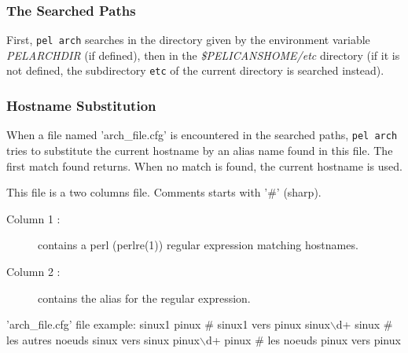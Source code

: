 \documentclass{article}
\begin{document}
\subsubsection*{The Searched Paths\label{arch_The_Searched_Paths}}


First, \texttt{pel arch} searches in the directory given by the environment
variable \emph{PELARCHDIR} (if defined), then in the \emph{\$PELICANSHOME/etc}
directory (if it is not defined, the subdirectory
\texttt{etc} of the current directory is searched instead).

\subsubsection*{Hostname Substitution\label{arch_Hostname_Substitution}}


When a file named 'arch\_file.cfg' is encountered in the searched paths,
\texttt{pel arch} tries to substitute the current hostname by an alias name found
in this file. The first match found returns. When no match is found, the
current hostname is used.



This file is a two columns file. Comments starts with '\#' (sharp).

\begin{description}

\item[Column 1 :] \mbox{}

contains a perl (perlre(1)) regular expression matching hostnames.


\item[Column 2 :] \mbox{}

contains the alias for the regular expression.

\end{description}


'arch\_file.cfg' file example:
 sinux1 pinux    \# sinux1 vers pinux
 sinux$\backslash$d+ sinux  \# les autres noeuds sinux vers sinux
 pinux$\backslash$d+ pinux  \# les noeuds pinux vers pinux
\end{document}
